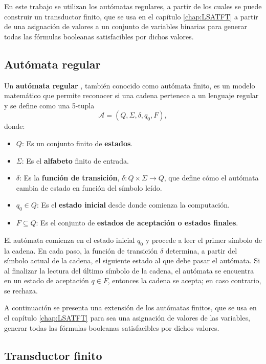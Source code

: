 En este trabajo se utilizan los autómatas regulares, a partir de los cuales se puede construir un transductor finito, 
que se usa en el capítulo \ref{chap:LSATFT} a partir de una asignación de valores a un conjunto de variables binarias para generar 
todas las fórmulas booleanas satisfacibles por dichos valores.

\subsection{Autómata regular}

\begin{definition}
  Un \textbf{autómata regular} \cite{authomataTheory}, también conocido como autómata finito, es un modelo matemático que permite reconocer si una cadena pertenece a un lenguaje regular y se define como una 5-tupla $$\mathcal{A} = (Q, \Sigma, \delta, q_0, F),$$ donde:
  
  \begin{itemize}
    \item $Q$: Es un conjunto finito de \textbf{estados}.
    \item $\Sigma$: Es el \textbf{alfabeto} finito de entrada.
    \item $\delta$: Es la \textbf{función de transición}, $\delta: Q \times \Sigma \to Q$, que define cómo el autómata cambia de estado en función del símbolo leído.
    \item $q_0 \in Q$: Es el \textbf{estado inicial} desde donde comienza la computación.
    \item $F \subseteq Q$: Es el conjunto de \textbf{estados de aceptación o estados finales}.
  \end{itemize}
\end{definition}


El autómata comienza en el estado inicial $q_0$ y procede a leer el primer símbolo de la cadena.  En cada paso, la función de transición $\delta$ determina, a partir del símbolo actual de la cadena, el siguiente estado al que debe pasar el autómata.  Si al finalizar la lectura del último símbolo de la cadena, el autómata se encuentra en un estado de aceptación $q \in F$, entonces la cadena se acepta; en caso contrario, se rechaza.

A continuación se presenta una extensión de los autómatas finitos, que se usa en el capítulo \ref{chap:LSATFT}
para sea una asignación de valores de las variables, generar todas las fórmulas booleanas satisfacibles por dichos valores.

\subsection{Transductor finito}

